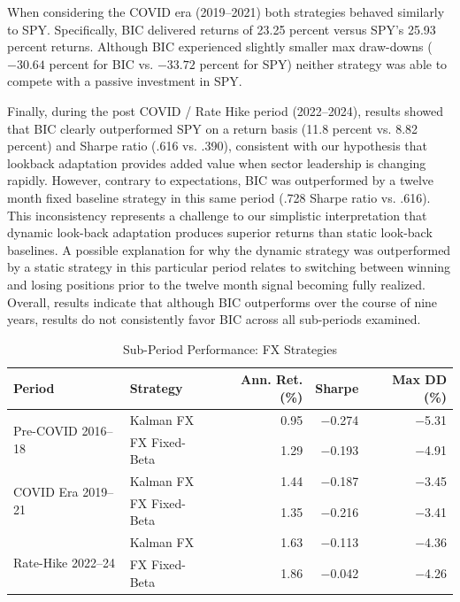 \documentclass[12pt]{article}
\begin{document}
When considering the COVID era (2019--2021) both strategies behaved similarly to SPY. Specifically, BIC delivered returns of 23.25 percent versus SPY's 25.93 percent returns. Although BIC experienced slightly smaller max draw-downs ($-30.64$ percent for BIC vs. $-33.72$ percent for SPY) neither strategy was able to compete with a passive investment in SPY.

Finally, during the post COVID / Rate Hike period (2022--2024), results showed that BIC clearly outperformed SPY on a return basis (11.8 percent vs. 8.82 percent) and Sharpe ratio (.616 vs. .390), consistent with our hypothesis that lookback adaptation provides added value when sector leadership is changing rapidly. However, contrary to expectations, BIC was outperformed by a twelve month fixed baseline strategy in this same period (.728 Sharpe ratio vs. .616). This inconsistency represents a challenge to our simplistic interpretation that dynamic look-back adaptation produces superior returns than static look-back baselines. A possible explanation for why the dynamic strategy was outperformed by a static strategy in this particular period relates to switching between winning and losing positions prior to the twelve month signal becoming fully realized. Overall, results indicate that although BIC outperforms over the course of nine years, results do not consistently favor BIC across all sub-periods examined.

\begin{table}[htbp]
\centering
\caption{Sub-Period Performance: FX Strategies}
\label{tab:subperiod_fx}
\begin{tabular}{llrrr}
\toprule
\textbf{Period} & \textbf{Strategy} & \textbf{Ann. Ret. (\%)} & \textbf{Sharpe} & \textbf{Max DD (\%)} \\
\midrule
\multirow{2}{*}{Pre-COVID 2016--18}
 & Kalman FX        &  0.95 & $-$0.274 & $-$5.31 \\
 & FX Fixed-Beta    &  1.29 & $-$0.193 & $-$4.91 \\
\midrule
\multirow{2}{*}{COVID Era 2019--21}
 & Kalman FX        &  1.44 & $-$0.187 & $-$3.45 \\
 & FX Fixed-Beta    &  1.35 & $-$0.216 & $-$3.41 \\
\midrule
\multirow{2}{*}{Rate-Hike 2022--24}
 & Kalman FX        &  1.63 & $-$0.113 & $-$4.36 \\
 & FX Fixed-Beta    &  1.86 & $-$0.042 & $-$4.26 \\
\bottomrule
\end{tabular}
\end{table}
\end{document}
